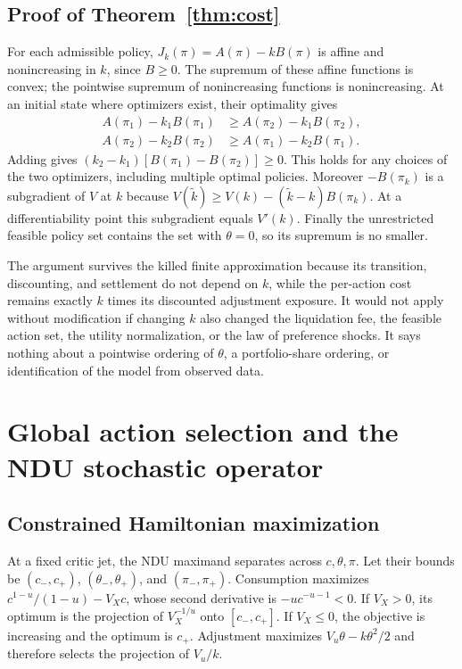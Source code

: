 \subsection{Proof of Theorem~\ref{thm:cost}}
For each admissible policy, $J_k(\pi)=A(\pi)-kB(\pi)$ is affine and nonincreasing in $k$, since $B\geq0$. The supremum of these affine functions is convex; the pointwise supremum of nonincreasing functions is nonincreasing. At an initial state where optimizers exist, their optimality gives
\begin{align*}
A(\pi_1)-k_1B(\pi_1)&\geq A(\pi_2)-k_1B(\pi_2),\\
A(\pi_2)-k_2B(\pi_2)&\geq A(\pi_1)-k_2B(\pi_1).
\end{align*}
Adding gives $(k_2-k_1)[B(\pi_1)-B(\pi_2)]\geq0$. This holds for any choices of the two optimizers, including multiple optimal policies. Moreover $-B(\pi_k)$ is a subgradient of $V$ at $k$ because
$V(\widetilde k)\geq V(k)-(\widetilde k-k)B(\pi_k)$. At a differentiability point this subgradient equals $V'(k)$. Finally the unrestricted feasible policy set contains the set with $\theta=0$, so its supremum is no smaller.

The argument survives the killed finite approximation because its transition, discounting, and settlement do not depend on $k$, while the per-action cost remains exactly $k$ times its discounted adjustment exposure. It would not apply without modification if changing $k$ also changed the liquidation fee, the feasible action set, the utility normalization, or the law of preference shocks. It says nothing about a pointwise ordering of $\theta$, a portfolio-share ordering, or identification of the model from observed data.

\section{Global action selection and the NDU stochastic operator}
\label{app:ndu}
\subsection{Constrained Hamiltonian maximization}
At a fixed critic jet, the NDU maximand separates across $c,\theta,\pi$. Let their bounds be $(c_-,c_+)$, $(\theta_-,\theta_+)$, and $(\pi_-,\pi_+)$. Consumption maximizes $c^{1-u}/(1-u)-V_X c$, whose second derivative is $-u c^{-u-1}<0$. If $V_X>0$, its optimum is the projection of $V_X^{-1/u}$ onto $[c_-,c_+]$. If $V_X\leq0$, the objective is increasing and the optimum is $c_+$. Adjustment maximizes $V_u\theta-k\theta^2/2$ and therefore selects the projection of $V_u/k$.

